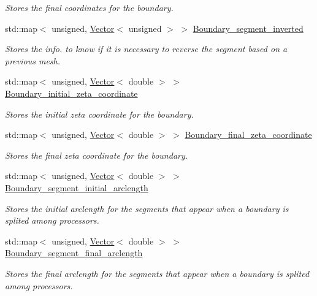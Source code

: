 \begin{DoxyCompactItemize}
\begin{DoxyCompactList}\small\item\em Stores the final coordinates for the boundary. \end{DoxyCompactList}\item 
std\+::map$<$ unsigned, \hyperlink{classoomph_1_1Vector}{Vector}$<$ unsigned $>$ $>$ \hyperlink{classoomph_1_1UnstructuredTwoDMeshGeometryBase_a66043cfe6f94d288008be15053313423}{Boundary\+\_\+segment\+\_\+inverted}
\begin{DoxyCompactList}\small\item\em Stores the info. to know if it is necessary to reverse the segment based on a previous mesh. \end{DoxyCompactList}\item 
std\+::map$<$ unsigned, \hyperlink{classoomph_1_1Vector}{Vector}$<$ double $>$ $>$ \hyperlink{classoomph_1_1UnstructuredTwoDMeshGeometryBase_abde4ed32016c0d3f78308414d3d06184}{Boundary\+\_\+initial\+\_\+zeta\+\_\+coordinate}
\begin{DoxyCompactList}\small\item\em Stores the initial zeta coordinate for the boundary. \end{DoxyCompactList}\item 
std\+::map$<$ unsigned, \hyperlink{classoomph_1_1Vector}{Vector}$<$ double $>$ $>$ \hyperlink{classoomph_1_1UnstructuredTwoDMeshGeometryBase_aa142423836a48f4efddc0c932f52c5e3}{Boundary\+\_\+final\+\_\+zeta\+\_\+coordinate}
\begin{DoxyCompactList}\small\item\em Stores the final zeta coordinate for the boundary. \end{DoxyCompactList}\item 
std\+::map$<$ unsigned, \hyperlink{classoomph_1_1Vector}{Vector}$<$ double $>$ $>$ \hyperlink{classoomph_1_1UnstructuredTwoDMeshGeometryBase_ac7b44efb9a02617df5e9e2294383f94a}{Boundary\+\_\+segment\+\_\+initial\+\_\+arclength}
\begin{DoxyCompactList}\small\item\em Stores the initial arclength for the segments that appear when a boundary is splited among processors. \end{DoxyCompactList}\item 
std\+::map$<$ unsigned, \hyperlink{classoomph_1_1Vector}{Vector}$<$ double $>$ $>$ \hyperlink{classoomph_1_1UnstructuredTwoDMeshGeometryBase_a3490d696ab12e97ec95762d712e86084}{Boundary\+\_\+segment\+\_\+final\+\_\+arclength}
\begin{DoxyCompactList}\small\item\em Stores the final arclength for the segments that appear when a boundary is splited among processors. \end{DoxyCompactList}\item 

\end{DoxyCompactItemize}
